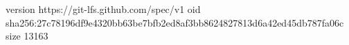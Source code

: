 version https://git-lfs.github.com/spec/v1
oid sha256:27c78196df9e4320bb63be7bfb2ed8af3bb8624827813d6a42ed45db787fa06c
size 13163
